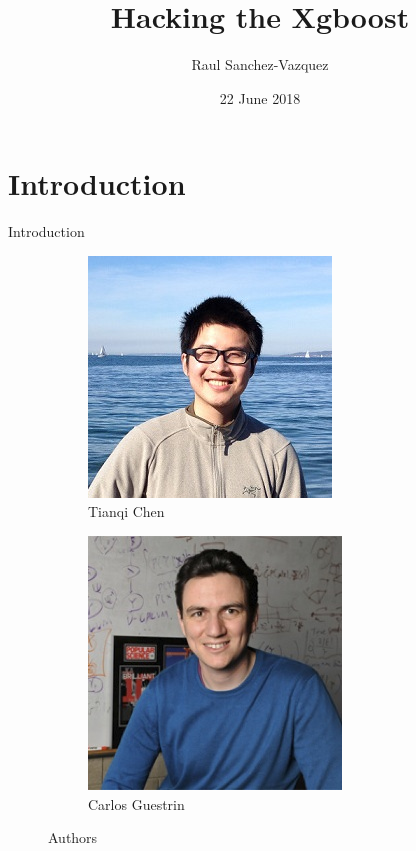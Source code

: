 \documentclass{beamer}
\title[Hacking the Xgboost]{Hacking the Xgboost}
\author{Raul Sanchez-Vazquez}
\institute{Kunumi}
\date{22 June 2018}
\begin{document}
\begin{frame}
  \titlepage
  
\end{frame}


\section{Introduction}

\begin{frame}{Introduction}

\begin{figure}
	\centering
	\begin{subfigure}{.45\textwidth}
		\centering
		\includegraphics[width=.7\linewidth]{img/Tianqi_Chen}
		\caption{Tianqi Chen}
		\label{fig:sub2}
	\end{subfigure}
	\begin{subfigure}{.45\textwidth}
		\centering
		\includegraphics[width=.7\linewidth]{img/Carlos_Guestrin}
		\caption{Carlos Guestrin}
		\label{fig:sub1}
	\end{subfigure}
	\caption{Authors}
	\label{fig:test}
\end{figure}
\end{frame}
\end{document}
